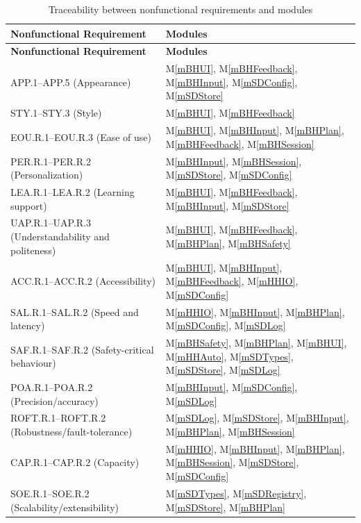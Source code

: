 \documentclass[12pt, titlepage]{article}
\newcommand{\mref}[1]{M\ref{#1}}
\begin{document}
\renewcommand{\arraystretch}{1.1}
\begin{longtable}{p{} p{}}
\caption{Traceability between nonfunctional requirements and modules}
\label{TblNFRRT}\\
\toprule
\textbf{Nonfunctional Requirement} & \textbf{Modules}\\
\midrule
\endfirsthead
\toprule
\textbf{Nonfunctional Requirement} & \textbf{Modules}\\
\midrule
\endhead
APP.1--APP.5 (Appearance)
  & \mref{mBHUI}, \mref{mBHFeedback}, \mref{mBHInput}, \mref{mSDConfig},
    \mref{mSDStore} \\
STY.1--STY.3 (Style)
  & \mref{mBHUI}, \mref{mBHFeedback} \\
EOU.R.1--EOU.R.3 (Ease of use)
  & \mref{mBHUI}, \mref{mBHInput}, \mref{mBHPlan}, \mref{mBHFeedback},
    \mref{mBHSession} \\
PER.R.1--PER.R.2 (Personalization)
  & \mref{mBHInput}, \mref{mBHSession}, \mref{mSDStore}, \mref{mSDConfig} \\
LEA.R.1--LEA.R.2 (Learning support)
  & \mref{mBHUI}, \mref{mBHFeedback}, \mref{mBHInput}, \mref{mSDStore} \\
UAP.R.1--UAP.R.3 (Understandability and politeness)
  & \mref{mBHUI}, \mref{mBHFeedback}, \mref{mBHPlan}, \mref{mBHSafety} \\
ACC.R.1--ACC.R.2 (Accessibility)
  & \mref{mBHUI}, \mref{mBHInput}, \mref{mBHFeedback}, \mref{mHHIO},
    \mref{mSDConfig} \\
SAL.R.1--SAL.R.2 (Speed and latency)
  & \mref{mHHIO}, \mref{mBHInput}, \mref{mBHPlan}, \mref{mSDConfig},
    \mref{mSDLog} \\
SAF.R.1--SAF.R.2 (Safety-critical behaviour)
  & \mref{mBHSafety}, \mref{mBHPlan}, \mref{mBHUI}, \mref{mHHAuto},
    \mref{mSDTypes}, \mref{mSDStore}, \mref{mSDLog} \\
POA.R.1--POA.R.2 (Precision/accuracy)
  & \mref{mBHInput}, \mref{mSDConfig}, \mref{mSDLog} \\
ROFT.R.1--ROFT.R.2 (Robustness/fault-tolerance)
  & \mref{mSDLog}, \mref{mSDStore}, \mref{mBHInput}, \mref{mBHPlan},
    \mref{mBHSession} \\
CAP.R.1--CAP.R.2 (Capacity)
  & \mref{mHHIO}, \mref{mBHInput}, \mref{mBHPlan}, \mref{mBHSession},
    \mref{mSDStore}, \mref{mSDConfig} \\
SOE.R.1--SOE.R.2 (Scalability/extensibility)
  & \mref{mSDTypes}, \mref{mSDRegistry}, \mref{mSDStore}, \mref{mBHPlan} \\

\end{longtable}
\end{document}
